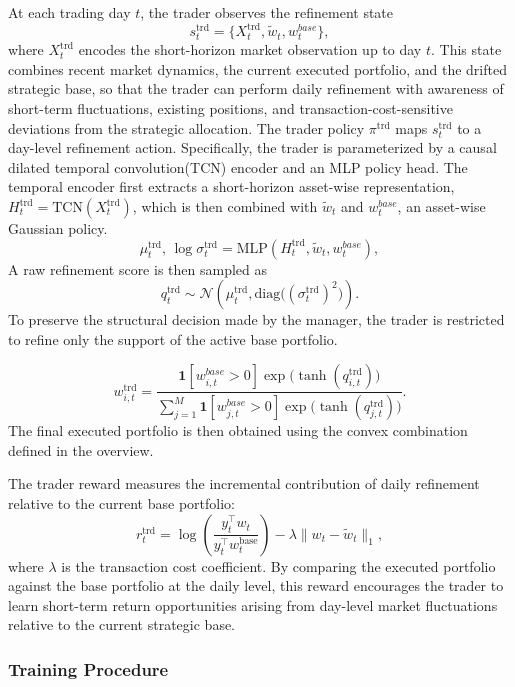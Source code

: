 \documentclass[letterpaper]{article} %
\begin{document}
At each trading day \(t\), the trader observes the refinement state
\[
s_t^{\mathrm{trd}}=\bigl\{X_t^{\mathrm{trd}},\tilde w_t, w_t^{base}\bigr\},
\]
where \(X_t^{\mathrm{trd}}\) encodes the short-horizon market observation up to day \(t\). This state combines recent market dynamics, the current executed portfolio, and the drifted strategic base, so that the trader can perform daily refinement with awareness of short-term fluctuations, existing positions, and transaction-cost-sensitive deviations from the strategic allocation. The trader policy \(\pi^{\mathrm{trd}}\) maps \(s_t^{\mathrm{trd}}\) to a day-level refinement action. Specifically, the trader is parameterized by a causal dilated temporal convolution(TCN) \citep{TCN} encoder and an MLP policy head. The temporal encoder first extracts a short-horizon asset-wise representation,
$H_t^{\mathrm{trd}}=\mathrm{TCN}(X_t^{\mathrm{trd}})$, which is then combined with \(\tilde w_t\) and \(w_t^{base}\), an asset-wise Gaussian policy.
\[
\mu_t^{\mathrm{trd}},\,\log\sigma_t^{\mathrm{trd}}
=
\mathrm{MLP}(H_t^{\mathrm{trd}},\tilde w_t,w_t^{base}),
\]
A raw refinement score is then sampled as
\[
q_t^{\mathrm{trd}}\sim
\mathcal{N}\!\left(
\mu_t^{\mathrm{trd}},
\mathrm{diag}\bigl((\sigma_t^{\mathrm{trd}})^2\bigr)
\right).
\]
To preserve the structural decision made by the manager, the trader is restricted to refine only the support of the active base portfolio.

\[
w_{i,t}^{\mathrm{trd}}
=
\frac{
\mathbf{1}[w_{i,t}^{base}>0]\exp\!\bigl(\tanh(q_{i,t}^{\mathrm{trd}})\bigr)
}{
\sum_{j=1}^{M}\mathbf{1}[w_{j,t}^{base}>0]\exp\!\bigl(\tanh(q_{j,t}^{\mathrm{trd}})\bigr)
}.
\]
The final executed portfolio is then obtained using the convex combination defined in the overview.

The trader reward measures the incremental contribution of daily refinement relative to the current base portfolio:
\[
r_t^{\mathrm{trd}}
=
\log\!\left(
\frac{y_t^\top w_t}{y_t^\top w_t^{\mathrm{base}}}
\right)
-
\lambda \|w_t-\tilde w_t\|_1,
\]
where \(\lambda\) is the transaction cost coefficient. By comparing the executed portfolio against the base portfolio at the daily level, this reward encourages the trader to learn short-term return opportunities arising from day-level market fluctuations relative to the current strategic base.

\subsubsection{Training Procedure}
\end{document}
